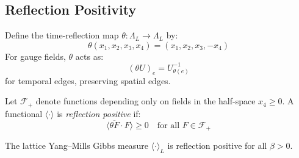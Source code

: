 \subsection{Reflection Positivity}

\begin{definition}[Reflection]
\label{def:reflection}
Define the time-reflection map $\theta : \Lambda_L \to \Lambda_L$ by:
\[
\theta(x_1, x_2, x_3, x_4) = (x_1, x_2, x_3, -x_4)
\]
For gauge fields, $\theta$ acts as:
\[
(\theta U)_e = U_{\theta(e)}^{-1}
\]
for temporal edges, preserving spatial edges.
\end{definition}

\begin{definition}
Let $\mathcal{F}_+$ denote functions depending only on fields in the half-space 
$x_4 \geq 0$. A functional $\langle \cdot \rangle$ is \emph{reflection positive} if:
\[
\langle \overline{\theta F} \cdot F \rangle \geq 0 \quad \text{for all } F \in \mathcal{F}_+
\]
\end{definition}

\begin{theorem}
\label{thm:reflection-pos}
\label{thm:rp_wilson}
\label{thm:rp_monotonicity}
\label{lem:log-rp-bound}
\label{thm:reflection-positivity}
The lattice Yang--Mills Gibbs measure $\langle \cdot \rangle_L$ is reflection positive 
for all $\beta > 0$.
\end{theorem}

